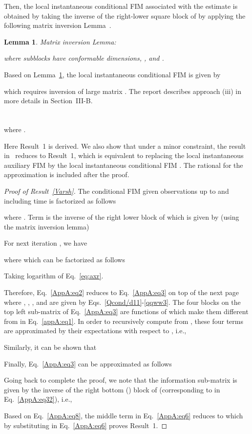 \documentclass[10pt,twocolumn,twoside]{IEEEtran}
\newtheorem{lemma}{\bf{Lemma}}
\begin{document}
Then, the local instantaneous conditional FIM  associated with the estimate
  is obtained by taking the inverse of the 
right-lower square block of  by applying the following matrix inversion Lemma~\cite{Zuo:2011}.
\begin{lemma}\label{MIL}
Matrix inversion Lemma:

where subblocks  have conformable
dimensions, , and
.
\end{lemma}
\noindent
Based on Lemma~\ref{MIL},  the local instantaneous conditional FIM is given by

which requires inversion of large matrix .
The report describes approach (iii) in more details in Section~III-B.
\section{} \label{app:A}
\begin{figure*}[t]
\normalsize
\setcounter{equation}{34}

where .

\setcounter{equation}{29}
\hrulefill
\vspace*{4pt}
\end{figure*}
Here Result~1 is derived. We also show that under a minor constraint,  the result in~\cite{Arash:SPL} reduces to Result~1, which is equivalent to replacing the local instantaneous auxiliary FIM   by the local instantaneous conditional FIM .
The rational for the approximation is included after the proof.
\begin{proof}[Proof of Result~\ref{Varsh}]
The conditional FIM given observations up to and including time  is factorized as follows

where .
Term  is the inverse of the right lower block of  which is given by  (using the matrix inversion lemma)

For next iteration , we have

where  which can be factorized as follows

Taking  logarithm of Eq.~\eqref{eq:axr}.

Therefore, Eq.~\eqref{AppA:eq2} reduces to Eq.~\eqref{AppA:eq3} on top of the next page
where , , , and  are given by Eqs.~\eqref{Qcond/d11}-\eqref{qqww3}.
The four blocks on the top left sub-matrix of Eq.~\eqref{AppA:eq3} are functions of  which make them different from  in Eq.~\eqref{appA:eq1}. In order to recursively compute  from , these four terms are approximated by their expectations with respect to , i.e.,
\setcounter{equation}{35}

Similarly, it can be shown that

Finally, Eq.~\eqref{AppA:eq3} can be approximated as follows

Going back to complete the proof, we note
that the information sub-matrix  is given
by the inverse of the right bottom () block of 
(corresponding to  in Eq.~\eqref{AppA:eq32}), i.e.,

Based on Eq.~\eqref{AppA:eq8},
the middle term in Eq.~\eqref{AppA:eq6} reduces to  which by
substituting  in Eq.~\eqref{AppA:eq6} proves Result~1.
\end{proof}
\end{document}
